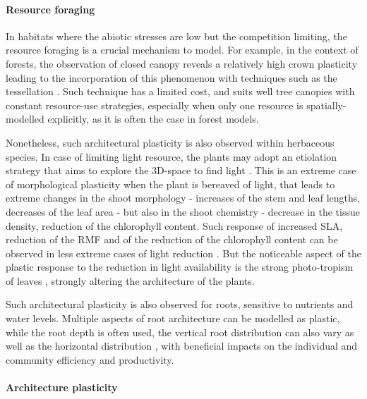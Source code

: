 \paragraph{Resource foraging}

In habitats where the abiotic stresses are low but the competition limiting, the resource foraging is a crucial mechanism to model. For example, in the context of forests, the observation of closed canopy reveals a relatively high crown plasticity leading to the incorporation of this phenomenon with techniques such as the tessellation \parencite{berger_competition_2008}. Such technique has a limited cost, and suits well tree canopies with constant resource-use strategies, especially when only one resource is spatially-modelled explicitly, as it is often the case in forest models. 

Nonetheless, such architectural plasticity is also observed within herbaceous species. In case of limiting light resource, the plants may adopt an etiolation strategy that aims to explore the 3D-space to find light \parencite{whippo_phototropism:_2006}. This is an extreme case of morphological plasticity when the plant is bereaved of light, that leads to extreme changes in the shoot morphology - increases of the stem and leaf lengths, decreases of the leaf area - but also in the shoot chemistry - decrease in the tissue density, reduction of the chlorophyll content. Such response of increased SLA, reduction of the RMF and of the reduction of the chlorophyll content can be observed in less extreme cases of light reduction \parencite{mitchell_intraspecific_2014}. But the noticeable aspect of the plastic response to the reduction in light availability is the strong photo-tropism of leaves \parencite{whippo_phototropism:_2006}, strongly altering the architecture of the plants.

Such architectural plasticity is also observed for roots, sensitive to nutrients and water levels. Multiple aspects of root architecture can be modelled as plastic, while the root depth is often used, the vertical root distribution can also vary \parencite{nippert_challenging_2015} as well as the horizontal distribution \parencite{maire_plasticity_2013}, with beneficial impacts on the individual and community efficiency and productivity.


\paragraph{Architecture plasticity}

